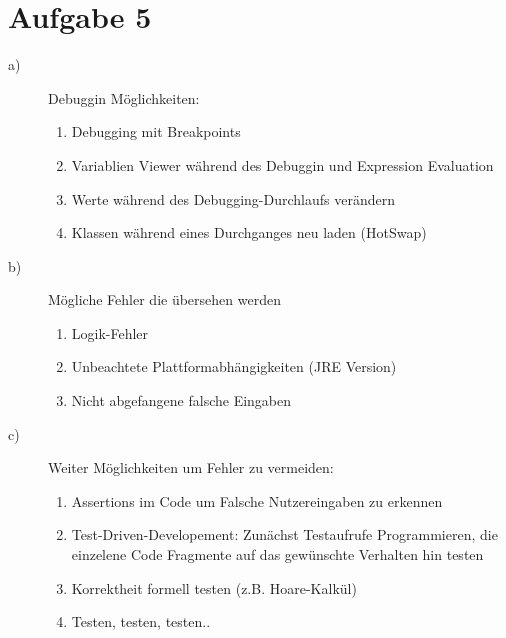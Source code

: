 \section{Aufgabe 5}
\begin{description}
\item[a)]
Debuggin Möglichkeiten:
\begin{enumerate}
\item Debugging mit Breakpoints
\item Variablien Viewer während des Debuggin und Expression Evaluation
\item Werte während des Debugging-Durchlaufs verändern
\item Klassen während eines Durchganges neu laden (HotSwap)   
\end{enumerate}
\item[b)]
Mögliche Fehler die übersehen werden
\begin{enumerate}
\item Logik-Fehler
\item Unbeachtete Plattformabhängigkeiten (JRE Version)
\item Nicht abgefangene falsche Eingaben 
\end{enumerate} 

\item[c)]
Weiter Möglichkeiten um Fehler zu vermeiden:
\begin{enumerate}
\item Assertions im Code um Falsche Nutzereingaben zu erkennen
\item Test-Driven-Developement: Zunächst Testaufrufe Programmieren, die einzelene Code Fragmente auf das gewünschte Verhalten hin testen
\item Korrektheit formell testen (z.B. Hoare-Kalkül)
\item Testen, testen, testen..
\end{enumerate}

\end{description}




